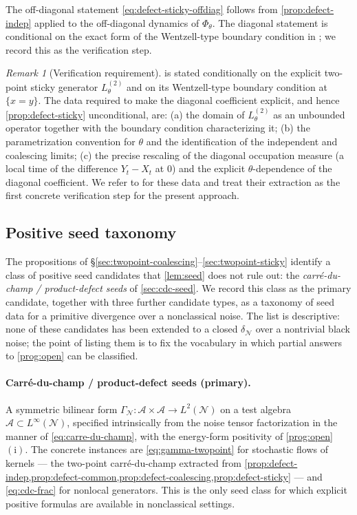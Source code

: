 \documentclass[11pt,reqno]{amsart}
\theoremstyle{plain}
\theoremstyle{definition}
\theoremstyle{remark}
\newtheorem{remark}[theorem]{Remark}
\begin{document}
The off-diagonal statement \eqref{eq:defect-sticky-offdiag} follows
from \cref{prop:defect-indep} applied to the off-diagonal dynamics
of $\Phi_{\theta}$. The diagonal statement is conditional on the
exact form of the Wentzell-type boundary condition in
\cite{LeJanRaimond2004}; we record this as the verification step.

\begin{remark}[Verification requirement]\label{rem:lejanraimond-todo}
 is stated conditionally on the explicit
two-point sticky generator $L^{(2)}_{\theta}$ and on its
Wentzell-type boundary condition at $\{x=y\}$. The data required to
make the diagonal coefficient explicit, and hence
\cref{prop:defect-sticky} unconditional, are: (a) the domain of
$L^{(2)}_{\theta}$ as an unbounded operator together with the
boundary condition characterizing it; (b) the parametrization
convention for $\theta$ and the identification of the independent
and coalescing limits; (c) the precise rescaling of the diagonal
occupation measure (a local time of the difference $Y_t-X_t$ at
$0$) and the explicit $\theta$-dependence of the diagonal
coefficient. We refer to \cite{LeJanRaimond2004} for these data and
treat their extraction as the first concrete verification step for
the present approach.
\end{remark}

\subsection{Positive seed taxonomy}\label{sec:seed-taxonomy}

The propositions of \S\ref{sec:twopoint-coalescing}--\ref{sec:twopoint-sticky}
identify a class of positive seed candidates that \cref{lem:seed}
does not rule out: the \emph{carr\'e-du-champ / product-defect
seeds} of \cref{sec:cdc-seed}. We record this class as the primary
candidate, together with three further candidate types, as a
taxonomy of seed data for a primitive divergence over a nonclassical
noise. The list is descriptive: none of these candidates has been
extended to a closed $\delta_{\mathcal N}$ over a nontrivial black
noise; the point of listing them is to fix the vocabulary in which
partial answers to \cref{prog:open} can be classified.

\paragraph{Carr\'e-du-champ / product-defect seeds (primary).}
A symmetric bilinear form
$\Gamma_{\mathcal N}\colon\mathcal A\times\mathcal A\to L^{2}(\mathcal N)$
on a test algebra $\mathcal A\subset L^{\infty}(\mathcal N)$,
specified intrinsically from the noise tensor factorization in the
manner of \eqref{eq:carre-du-champ}, with the energy-form positivity
of \cref{prog:open}$(\mathrm i)$. The concrete instances are
\eqref{eq:gamma-twopoint} for stochastic flows of kernels --- the
two-point carr\'e-du-champ extracted from
\cref{prop:defect-indep,prop:defect-common,prop:defect-coalescing,prop:defect-sticky}
--- and \eqref{eq:cdc-frac} for nonlocal generators. This is the
only seed class for which explicit positive formulas are available
in nonclassical settings.
\end{document}
